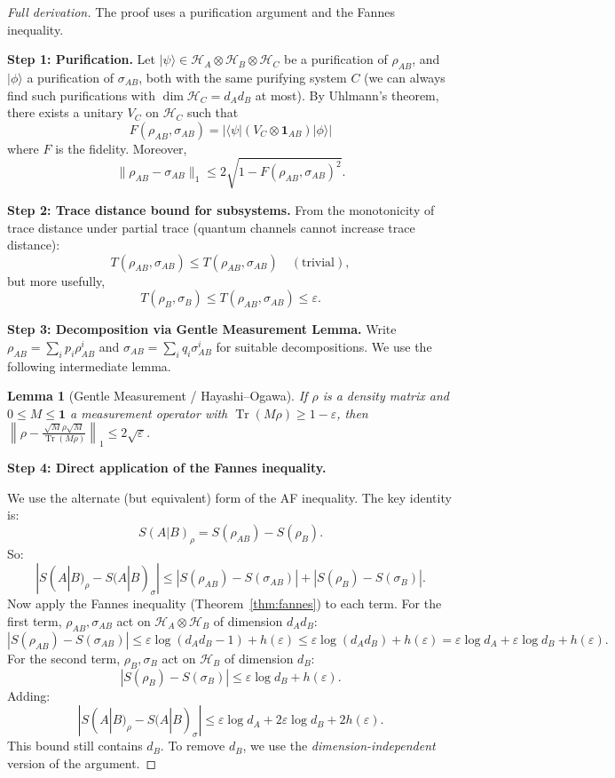 \documentclass[12pt,a4paper]{article}
\newtheorem{lemma}[theorem]{Lemma}
\DeclareMathOperator{\Tr}{Tr}
\newcommand{\HS}{\mathcal{H}}
\begin{document}
\begin{proof}[Full derivation]
The proof uses a purification argument and the Fannes inequality.

\medskip
\noindent\textbf{Step 1: Purification.}
Let $|\psi\rangle\in\HS_A\otimes\HS_B\otimes\HS_C$ be a purification of
$\rho_{AB}$, and $|\phi\rangle$ a purification of $\sigma_{AB}$, both with the
same purifying system $C$ (we can always find such purifications with
$\dim\HS_C=d_Ad_B$ at most).  By Uhlmann's theorem, there exists a unitary
$V_C$ on $\HS_C$ such that
\[
  F(\rho_{AB},\sigma_{AB})
  = |\langle\psi|(V_C\otimes\mathbf{1}_{AB})|\phi\rangle|
\]
where $F$ is the fidelity.  Moreover,
\[
  \|\rho_{AB}-\sigma_{AB}\|_1\leq 2\sqrt{1-F(\rho_{AB},\sigma_{AB})^2}.
\]

\medskip
\noindent\textbf{Step 2: Trace distance bound for subsystems.}
From the monotonicity of trace distance under partial trace (quantum channels
cannot increase trace distance):
\[
  T(\rho_{AB},\sigma_{AB}) \leq T(\rho_{AB},\sigma_{AB}) \quad(\text{trivial}),
\]
but more usefully,
\[
  T(\rho_B,\sigma_B)\leq T(\rho_{AB},\sigma_{AB})\leq\varepsilon.
\]

\medskip
\noindent\textbf{Step 3: Decomposition via Gentle Measurement Lemma.}
Write $\rho_{AB}=\sum_i p_i\rho_{AB}^i$ and $\sigma_{AB}=\sum_i q_i\sigma_{AB}^i$
for suitable decompositions.  We use the following intermediate lemma.

\begin{lemma}[Gentle Measurement / Hayashi--Ogawa]\label{lem:gentle}
If $\rho$ is a density matrix and $0\leq M\leq\mathbf{1}$ a measurement
operator with $\Tr(M\rho)\geq 1-\varepsilon$, then
$\left\|\rho-\frac{\sqrt{M}\rho\sqrt{M}}{\Tr(M\rho)}\right\|_1\leq 2\sqrt{\varepsilon}$.
\end{lemma}

\medskip
\noindent\textbf{Step 4: Direct application of the Fannes inequality.}

We use the alternate (but equivalent) form of the AF inequality.  The key
identity is:
\[
  S(A|B)_\rho = S(\rho_{AB}) - S(\rho_B).
\]
So:
\[
  |S(A|B)_\rho - S(A|B)_\sigma|
  \leq |S(\rho_{AB}) - S(\sigma_{AB})| + |S(\rho_B) - S(\sigma_B)|.
\]
Now apply the Fannes inequality (Theorem~\ref{thm:fannes}) to each term.
For the first term, $\rho_{AB},\sigma_{AB}$ act on $\HS_A\otimes\HS_B$ of
dimension $d_Ad_B$:
\[
  |S(\rho_{AB}) - S(\sigma_{AB})|
  \leq \varepsilon\log(d_Ad_B-1) + h(\varepsilon)
  \leq \varepsilon\log(d_Ad_B) + h(\varepsilon)
  = \varepsilon\log d_A + \varepsilon\log d_B + h(\varepsilon).
\]
For the second term, $\rho_B,\sigma_B$ act on $\HS_B$ of dimension $d_B$:
\[
  |S(\rho_B) - S(\sigma_B)| \leq \varepsilon\log d_B + h(\varepsilon).
\]
Adding:
\[
  |S(A|B)_\rho - S(A|B)_\sigma|
  \leq \varepsilon\log d_A + 2\varepsilon\log d_B + 2h(\varepsilon).
\]
This bound still contains $d_B$.  To remove $d_B$, we use the
\emph{dimension-independent} version of the argument.


\end{proof}
\end{document}
